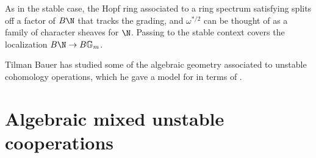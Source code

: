 \begin{remark}
As in the stable case, the Hopf ring associated to a ring spectrum satisfying {\UFH} splits off a factor of \(B\N\) that tracks the grading, and \(\omega^{*/2}\) can be thought of as a family of character sheaves for \(\N\).  Passing to the stable context covers the localization \(B\N \to B\Gm\).
\end{remark}

\begin{remark}
Tilman Bauer has studied some of the algebraic geometry associated to unstable cohomology operations, which he gave a model for in terms of .
\end{remark}










\section{Algebraic mixed unstable cooperations}\label{UnstableAlgebraicModelSection}

